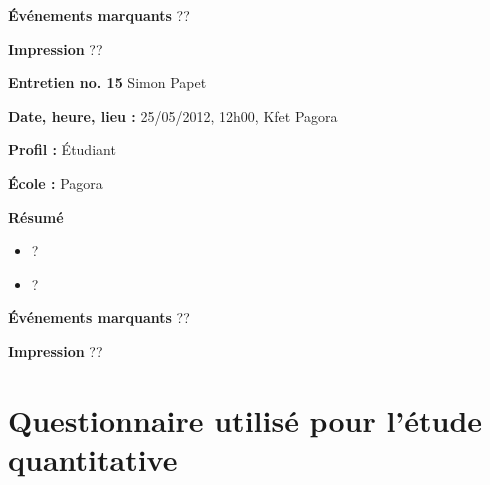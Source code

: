 \documentclass[a4paper, 11px]{article}
\begin{document}
\textbf{Événements marquants}
??

\textbf{Impression}
??



\vspace{.3cm}

 \textbf {\large Entretien no. 15}
Simon Papet

\textbf{Date, heure, lieu : }
25/05/2012, 12h00, Kfet Pagora

\textbf{Profil : }
Étudiant 

\textbf{École : }
Pagora

\textbf{Résumé}
	\begin{itemize}
		\item ?
		\item ?
	\end{itemize}

\textbf{Événements marquants}
??

\textbf{Impression}
??
\newpage

\section{Questionnaire utilisé pour l'étude quantitative}
\end{document}

